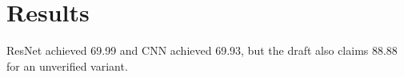\section{Results}
ResNet achieved 69.99 and CNN achieved 69.93, but the draft also claims 88.88 for an unverified variant.
